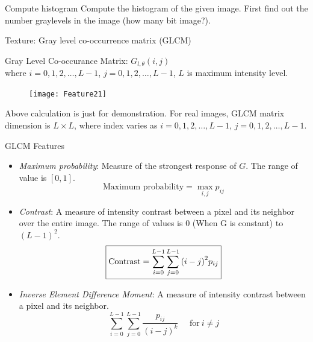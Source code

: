 \begin{frame}{Compute histogram}
Compute the histogram of the given image. First find out the number graylevels in the image (how many bit image?).
\begin{figure}
\end{figure}
\end{frame}

\begin{frame}{Texture: Gray level co-occurrence matrix (GLCM)}
\begin{itemize}
\begin{small}
\item Gray Level Co-occurance Matrix:  $G_{l,\theta}(i,j)$\\
where $i=0,1,2,\ldots,L-1$, $j=0,1,2,\ldots,L-1$, $L$ is maximum intensity level.
\begin{figure}
\texttt{[image: Feature21]}
\end{figure}
\item Above calculation is just for demonstration. For real images, GLCM matrix dimension is $L\times L$, where index varies as $i=0,1,2,\ldots,L-1$, $j=0,1,2,\ldots,L-1$.
\end{small}
\end{itemize}
\end{frame}

\begin{frame}{GLCM Features}
\begin{footnotesize}
\begin{itemize}
\item \textit{\color{mycolor1}Maximum probability}: Measure of the strongest response of $G$. The range of value is $[0,1]$.
\begin{equation}
\boxed{\text{Maximum probability}=\max_{i,j}{p_{ij}}}\nonumber
\end{equation}
\item \textit{\color{mycolor1}Contrast}: A measure of intensity contrast between a pixel and its neighbor over the entire image. The range of values is 0 (When G is constant) to $(L-1)^2$.
\begin{equation}
\boxed{{\rm Contrast} = \sum\limits_{i = 0}^{L-1} {\sum\limits_{j = 0}^{L-1} {{{(i - j)}^2}{p_{ij}}} }}\nonumber
\end{equation}
\item \textit{\color{mycolor1}Inverse Element Difference Moment}: A measure of intensity contrast between a pixel and its neighbor.
\begin{equation}
\sum\limits_{i = 0}^{L-1} {\sum\limits_{j = 0}^{L-1} {\frac{{{p_{ij}}}}{{{{(i - j)}^k}}}} } ~~~~~~{\text{for}~ i\neq j}\nonumber
\end{equation}
\end{itemize}
\end{footnotesize}
\end{frame}

